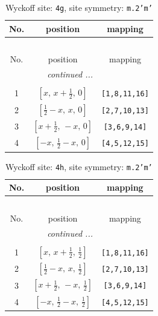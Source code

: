 \documentclass[fleqn,8pt]{jsarticle}
\begin{document}
\renewcommand{\arraystretch}{1.2}
\begin{longtable}{ccc}
\caption{Wyckoff site: {\tt 4g}, site symmetry: {\tt m.2'm'}}
 \\
 \hline \hline
No. & position & mapping \\ \hline \endfirsthead

\multicolumn{2}{l}{\tablename\ \thetable{}} \\
 \hline \hline
No. & position & mapping \\ \hline \endhead

 \hline \hline
\multicolumn{2}{r}{\footnotesize\it continued ...} \\ \endfoot

 \hline \hline
\multicolumn{2}{r}{} \\ \endlastfoot

1 & $\left[ x,\, x + \frac{1}{2},\, 0 \right]$ & {\tt [1,8,11,16]} \\ \hline
2 & $\left[ \frac{1}{2} - x,\, x,\, 0 \right]$ & {\tt [2,7,10,13]} \\ \hline
3 & $\left[ x + \frac{1}{2},\, - x,\, 0 \right]$ & {\tt [3,6,9,14]} \\ \hline
4 & $\left[ - x,\, \frac{1}{2} - x,\, 0 \right]$ & {\tt [4,5,12,15]} \\
\end{longtable}
\renewcommand{\arraystretch}{1.2}
\begin{longtable}{ccc}
\caption{Wyckoff site: {\tt 4h}, site symmetry: {\tt m.2'm'}}
 \\
 \hline \hline
No. & position & mapping \\ \hline \endfirsthead

\multicolumn{2}{l}{\tablename\ \thetable{}} \\
 \hline \hline
No. & position & mapping \\ \hline \endhead

 \hline \hline
\multicolumn{2}{r}{\footnotesize\it continued ...} \\ \endfoot

 \hline \hline
\multicolumn{2}{r}{} \\ \endlastfoot

1 & $\left[ x,\, x + \frac{1}{2},\, \frac{1}{2} \right]$ & {\tt [1,8,11,16]} \\ \hline
2 & $\left[ \frac{1}{2} - x,\, x,\, \frac{1}{2} \right]$ & {\tt [2,7,10,13]} \\ \hline
3 & $\left[ x + \frac{1}{2},\, - x,\, \frac{1}{2} \right]$ & {\tt [3,6,9,14]} \\ \hline
4 & $\left[ - x,\, \frac{1}{2} - x,\, \frac{1}{2} \right]$ & {\tt [4,5,12,15]} \\
\end{longtable}
\end{document}
